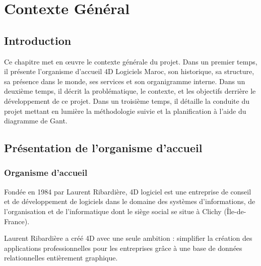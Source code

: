 
\chapter{Contexte Général}
\pagestyle{chapterstyle}




\newpage
\vspace{1cm}
\section{Introduction}
Ce chapitre met en œuvre le contexte générale du projet. Dans un premier temps, il
présente l’organisme d’accueil 4D Logiciels Maroc, son historique, sa structure, sa présence
dans le monde, ses services et son organigramme interne. Dans un deuxième temps, il décrit
la problématique, le contexte, et les objectifs derrière le développement de ce projet. Dans
un troisième temps, il détaille la conduite du projet mettant en lumière la méthodologie
suivie et la planification à l’aide du diagramme de Gant.


\section{Présentation de l’organisme d’accueil}
\subsection{Organisme d'accueil}

Fondée en 1984 par Laurent Ribardière, 4D logiciel est une entreprise de conseil et de
développement de logiciels dans le domaine des systèmes d’informations, de l’organisation
et de l’informatique dont le siège social se situe à Clichy (Île-de-France).
\newline

Laurent Ribardière a créé 4D avec une seule ambition : simplifier la création des
applications professionnelles pour les entreprises grâce à une base de données relationnelles
entièrement graphique.
\newline


